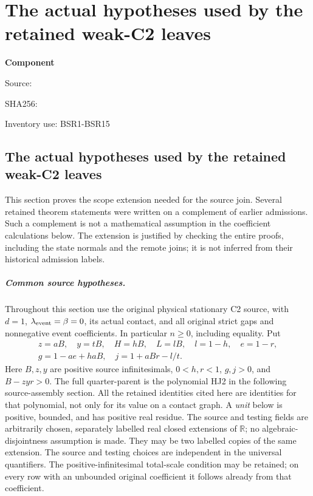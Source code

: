 \chapter{The actual hypotheses used by the retained weak-C2 leaves}
\label{component:p49f367f1b5e8}
\noindent\textbf{Component }\par
{\small\noindent Source: \par}
{\small\noindent SHA256: \par}
{\small\noindent Inventory use: BSR1-BSR15\par}
\medskip
\section{The actual hypotheses used by the retained weak-C2 leaves}
\label{p49f367f1b5e8:sec:weak-c2-bare-source-audit}

This section proves the scope extension needed for the source join.
Several retained theorem statements were written on a complement of
earlier admissions.  Such a complement is not a mathematical
assumption in the coefficient calculations below.  The extension is
justified by checking the entire proofs, including the state normals
and the remote joins; it is not inferred from their historical
admission labels.

\paragraph{Common source hypotheses.}
Throughout this section use the original physical stationary C2
source, with \(d=1\), \(\lambda_{\rm event}=\beta=0\), its actual
contact, and all original strict gaps and nonnegative event
coefficients.  In particular \(n\geq0\), including equality.
Put
\[
\begin{gathered}
 z=aB,\quad y=tB,\quad H=hB,\quad L=lB,\quad
 l=1-h,\quad e=1-r,\\
 g=1-ae+haB,\quad j=1+aBr-l/t .
\end{gathered}
 \tag{BSR1}
\]
Here \(B,z,y\) are positive source infinitesimals, \(0<h,r<1\),
\(g,j>0\), and \(B-zyr>0\).
The full quarter-parent is the polynomial HJ2 in the following
source-assembly section.  All the retained identities cited here
are identities for that polynomial, not only for its value on a
contact graph.
A \emph{unit} below is positive, bounded, and has positive real
residue.  The source and testing fields are arbitrarily chosen,
separately labelled real closed extensions of \(\mathbb R\);
no algebraic-disjointness assumption is made.  They may be
two labelled copies of the same extension.  The source and
testing choices are independent in the universal quantifiers.
The positive-infinitesimal total-scale condition may be retained;
on every row with an unbounded original coefficient it follows
already from that coefficient.

